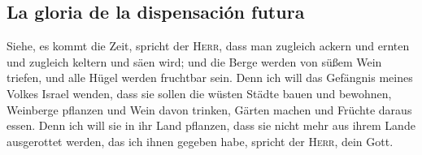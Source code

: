\hypertarget{la-gloria-de-la-dispensaciuxf3n-futura}{%
\subsection{La gloria de la dispensación
futura}\label{la-gloria-de-la-dispensaciuxf3n-futura}}

 Siehe, es kommt die Zeit, spricht der \textsc{Herr},
dass man zugleich ackern und ernten und zugleich keltern und säen wird;
und die Berge werden von süßem Wein triefen, und alle Hügel werden
fruchtbar sein.  Denn ich will das Gefängnis meines
Volkes Israel wenden, dass sie sollen die wüsten Städte bauen und
bewohnen, Weinberge pflanzen und Wein davon trinken, Gärten machen und
Früchte daraus essen.  Denn ich will sie in ihr Land
pflanzen, dass sie nicht mehr aus ihrem Lande ausgerottet werden, das
ich ihnen gegeben habe, spricht der \textsc{Herr}, dein Gott.
